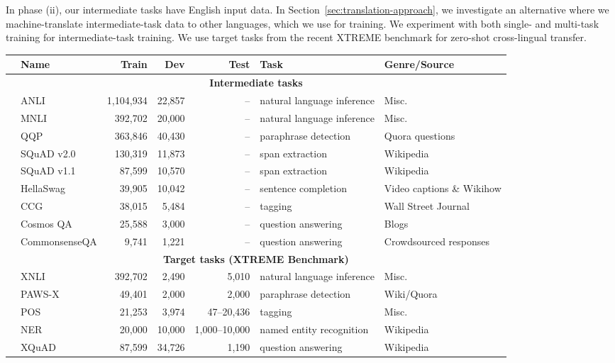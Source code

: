 \documentclass[11pt,a4paper]{article}
\newcommand{\anli}{ANLI}
\begin{document}
In phase (ii), our intermediate tasks have English input data.
In Section~\ref{sec:translation-approach}, we investigate an alternative where we machine-translate intermediate-task data to other languages, which we use for training.
We experiment with both single- and multi-task training for intermediate-task training.
We use target tasks from the recent XTREME benchmark for zero-shot cross-lingual transfer.




\begin{table*}[t]
  \small
  \centering
  \begin{tabular}{llrrrll}
    \toprule
    & \textbf{Name} & \textbf{Train}  & \textbf{Dev}  & \textbf{Test} & \textbf{Task} & \textbf{Genre/Source} \\ 
    \midrule
    \multicolumn{7}{c}{\bf Intermediate tasks}\\
    \midrule
    & \anli & 1,104,934 & 22,857 & -- & natural language inference & Misc.\\
    & MNLI & 392,702 & 20,000 & -- & natural language inference & Misc.\\
    & QQP & 363,846 & 40,430 &-- & paraphrase detection & Quora questions\\
    & SQuAD v2.0 & 130,319 & 11,873 &-- & span extraction & Wikipedia\\
    & SQuAD v1.1 & 87,599 & 10,570 & -- & span extraction & Wikipedia\\
    & HellaSwag & 39,905 & 10,042 & -- & sentence completion & Video captions \& Wikihow \\
    & CCG & 38,015 & 5,484 & -- & tagging & Wall Street Journal\\
    & Cosmos QA  & 25,588 & 3,000 & -- & question answering & Blogs \\
    & CommonsenseQA & 9,741 & 1,221 & -- & question answering & Crowdsourced responses \\     \midrule
    \multicolumn{7}{c}{\bf Target tasks (XTREME Benchmark)}\\
    \midrule
    & XNLI & 392,702 & 2,490 & 5,010 & natural language inference & Misc. \\
    & PAWS-X & 49,401 & 2,000 & 2,000 & paraphrase detection & Wiki/Quora \\
    & POS & 21,253 & 3,974 & 47--20,436 & tagging & Misc. \\
    & NER & 20,000 & 10,000 & 1,000--10,000 & named entity recognition & Wikipedia \\
    & XQuAD & 87,599 & 34,726 & 1,190 & question answering & Wikipedia\\

\end{tabular}
\end{table*}
\end{document}
